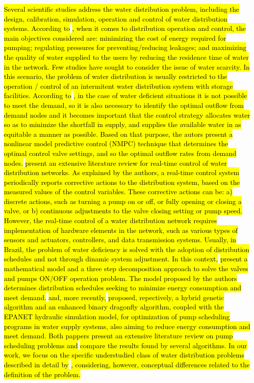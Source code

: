 \documentclass{singlecol}
\theoremstyle{TH}{
\newtheorem{lemma}{Lemma}
\newtheorem{theorem}[lemma]{Theorem}
\newtheorem{corrolary}[lemma]{Corrolary}
\newtheorem{conjecture}[lemma]{Conjecture}
\newtheorem{proposition}[lemma]{Proposition}
\newtheorem{claim}[lemma]{Claim}
\newtheorem{stheorem}[lemma]{Wrong Theorem}
\newtheorem{algorithm}{Algorithm}
}
\theoremstyle{THrm}{
\newtheorem{definition}{Definition}[section]
\newtheorem{question}{Question}[section]
\newtheorem{remark}{Remark}
\newtheorem{scheme}{Scheme}
}
\theoremstyle{THhit}{
\newtheorem{case}{Case}[section]
}
\begin{document}
\hl{Several scientific studies address the water distribution problem, including the design, calibration, simulation, operation and control of water distribution systems. According to} \cite{SankarEtAl2015}\hl{, when it comes to distribution operation and control, the main objectives considered are: minimizing the cost of energy required for pumping; regulating pressures for preventing/reducing leakages; and maximizing the quality of water supplied to the users by reducing the residence time of water in the network. Few studies have sought to consider the issue of water scarcity. In this scenario, the problem of water distribution is usually restricted to the operation / control of an intermitent water distribution system with storage facilities. According to} \cite{SankarEtAl2015}\hl{, in the case of water deficient situations it is not possible to meet the demand, so it is also necessary to identify the optimal outflow from demand nodes and it becomes important that the control strategy allocates water so as to minimize the shortfall in supply, and supplies the available water in as equitable a manner as possible. Based on that purpose, the autors present a nonlinear model predictive control (NMPC) technique that determines the optimal control valve settings, and so the optimal outflow rates from demand nodes.} \cite{CreacoEtAl2019} \hl{present an extensive literature review for real-time control of water distribution networks. As explained by the authors, a real-time control system periodically reports corrective actions to the distribution system, based on the measured values of the control variables. These corrective actions can be: a) discrete actions, such as turning a pump on or off, or fully opening or closing a valve, or b) continuous adjustments to the valve closing setting or pump speed. However, the real-time control of a water distribution network requires implementation of hardware elements in the network, such as various types of sensors and actuators, controllers, and data transmission systems. Usually, in Brazil, the problem of water deficiency is solved with the adoption of distribution schedules and not through dinamic system adjustment. In this context,} \cite{KurianEtAl2018} \hl{present a mathematical model and a three step decomposition approach to solve the valves and pumps ON/OFF operation problem. The model proposed by the authors determines distribution schedules seeking to minimize energy consumption and meet demand.} \cite{LunaEtAl2019} \hl{and, more recently,} \cite{JafariEtAl2021} \hl{proposed, repectively, a hybrid genetic algorithm and an enhanced binary dragonfly algorithm, coupled with the EPANET hydraulic simulation model, for optimization of pump scheduling programs in water supply systems, also aiming to reduce energy consumption and meet demand. Both pappers present an extensive literature review on pump scheduling problems and} \cite{JafariEtAl2021} \hl{compare the results found by several algorithms. In our work, we focus on the specific understudied class of water distribution problems described in detail by}  \cite{KurianEtAl2018}\hl{, considering, however, conceptual differences related to the definition of the problem.}
\end{document}
